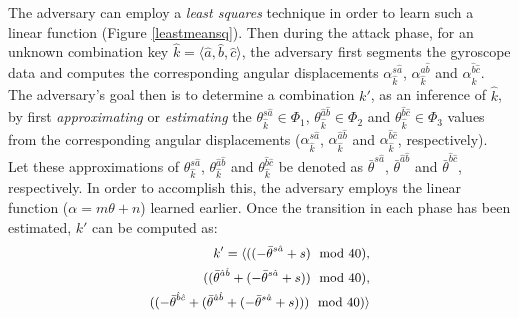 \documentclass[]{IEEEtran}
\begin{document}
The adversary can employ a \emph{least squares} \cite{york1966least} technique in order to learn such a linear function (Figure \ref{leastmeansq}). 
Then during the attack phase, for an unknown combination key $\hat{k}=\langle \hat{a},\hat{b},\hat{c}\rangle $, the adversary first segments the gyroscope data and computes the corresponding angular displacements $\alpha^{s\hat{a}}_{\hat{k}}$, $\alpha^{\hat{a}\hat{b}}_{\hat{k}}$ and $\alpha^{\hat{b}\hat{c}}_{\hat{k}}$. 
The adversary's goal then is to determine a combination $k'$, as an inference of $\hat{k}$, by first \emph{approximating} or \emph{estimating} the $\theta^{s\hat{a}}_{\hat{k}} \in \Phi_{1}$, $\theta^{\hat{a}\hat{b}}_{\hat{k}} \in \Phi_{2}$ and $\theta^{\hat{b}\hat{c}}_{\hat{k}} \in \Phi_{3}$ values from the corresponding angular displacements ($\alpha^{s\hat{a}}_{\hat{k}}$, $\alpha^{\hat{a}\hat{b}}_{\hat{k}}$ and $\alpha^{\hat{b}\hat{c}}_{\hat{k}}$, respectively). Let these approximations of $\theta^{s\hat{a}}_{\hat{k}}$, $\theta^{\hat{a}\hat{b}}_{\hat{k}}$ and $\theta^{\hat{b}\hat{c}}_{\hat{k}}$ be denoted as $\bar{\theta}^{s\hat{a}}$, $\bar{\theta}^{\hat{a}\hat{b}}$ and $\bar{\theta}^{\hat{b}\hat{c}}$, respectively. In order to accomplish this, the adversary employs the linear function ($\alpha=m\theta+n$) learned earlier. Once the transition in each phase has been estimated, $k'$ can be computed as:
\begin{equation}
\small
\begin{aligned}
k'=\langle ((-\bar{\theta}^{s\hat{a}}+s)\mod{40}), \\((\bar{\theta}^{\hat{a}\hat{b}}+(-\bar{\theta}^{s\hat{a}}+s))\mod{40}),\\ ((-\bar{\theta}^{\hat{b}\hat{c}}+(\bar{\theta}^{\hat{a}\hat{b}}+(-\bar{\theta}^{s\hat{a}}+s)))\mod{40})\rangle 
\end{aligned}
\label{padlockkeyformula}
\end{equation}
\end{document}
